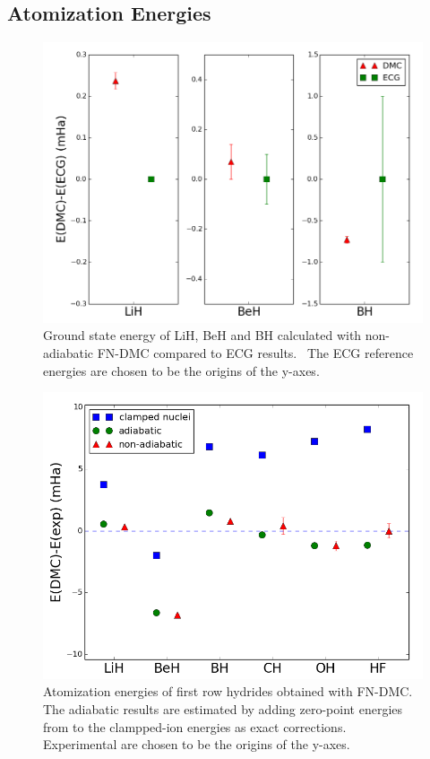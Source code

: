 \documentclass[pra,superscriptaddress,groupedaddress,twocolumn]{revtex4}
\begin{document}


\subsection{Atomization Energies}

\begin{figure}
\centering
\includegraphics[scale=.4]{Figures/dia-ECG}
\caption{Ground state energy of LiH, BeH and BH calculated with non-adiabatic FN-DMC compared to ECG results.~\cite{Adamowicz_LiH,Koput_BeH,Miliordos_BH} The ECG reference energies are chosen to be the origins of the y-axes.}
\end{figure}

\begin{figure}
\centering
\includegraphics[scale=.4]{Figures/atomization}
\caption{Atomization energies of first row hydrides obtained with FN-DMC. The adiabatic results are estimated by adding zero-point energies from \cite{Feller_Corrections} to the clampped-ion energies as exact corrections. Experimental are chosen to be the origins of the y-axes.}
\end{figure}
\end{document}
